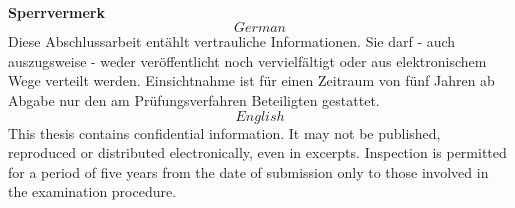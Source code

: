 \cleardoublepage

\



\pagestyle{empty}
\vfill
\textbf{Sperrvermerk}\\

\[German\] Diese Abschlussarbeit ent\"ahlt vertrauliche Informationen. Sie darf - auch auszugsweise - weder ver\"offentlicht noch vervielf\"altigt oder aus elektronischem Wege verteilt werden. Einsichtnahme ist f\"ur einen Zeitraum von f\"unf Jahren ab Abgabe nur den am Pr\"ufungsverfahren Beteiligten gestattet.\\

\[English\] This thesis contains confidential information. It may not be published, reproduced or distributed electronically, even in excerpts. Inspection is permitted for a period of five years from the date of submission only to those involved in the examination procedure.\\
